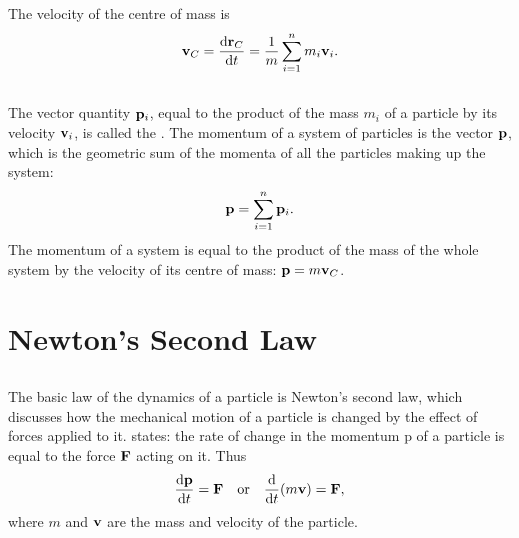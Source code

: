 The velocity of the centre of mass is
\begin{equation*}%
\vb{v}_{C} = \dv{\vb{r}_{C}}{t} =  \frac{1}{m} \sum_{i=1}^{n} m_{i} \vb{v}_{i}.
\end{equation*}

\subsection{}\label{2.3.4} The vector quantity $\vb{p}_{i}$, equal to the product of the mass $m_{i}$ of a particle by its velocity $\vb{v}_{i}$, is called the . The momentum of a system of particles is the vector $\vb{p}$, which is the geometric sum of the momenta of all the particles making up the system:
\begin{equation*}%
\vb{p} =   \sum_{i=1}^{n} \vb{p}_{i}.
\end{equation*}
The momentum of a system is equal to the product of the mass of the whole system by the velocity of its centre of mass: $\vb{p}= m\vb{v}_{C}$.

\section{Newton's Second Law}
\label{sec-2.4}

\subsection{}\label{2.4.1} The basic law of the dynamics of a particle is Newton's second law, which discusses how the mechanical motion of a particle is changed by the effect of forces applied to it.  states: the rate of change in the momentum p of a particle is equal to the force $\vb{F}$ acting on it. Thus
\begin{equation*}%
\dv{\vb{p}}{t} = \vb{F} \qor \dv{t} (m \vb{v}) = \vb{F},
\end{equation*}
where $m$ and $\vb{v}$ are the mass and velocity of the particle.

